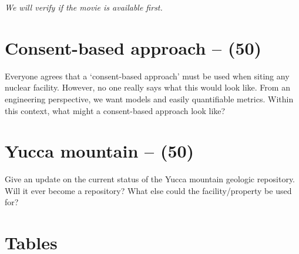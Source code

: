 \documentclass[11pt,a4paper]{article}
\makeatletter
\renewcommand\listoftables{%
    \@starttoc{lot}%
}
\makeatother
\begin{document}
\textit{We will verify if the movie is available first.}





\newpage

\section{Consent-based approach -- (50)}
Everyone agrees that a `consent-based approach' must be used when siting any nuclear facility. However, no one really says what this would look like. From an engineering perspective, we want models and easily quantifiable metrics. Within this context, what might a consent-based approach look like?





\newpage

\section{Yucca mountain -- (50)}
Give an update on the current status of the Yucca mountain geologic repository. Will it ever become a repository? What else could the facility/property be used for?





\pagestyle{fancyplain}
\fancyhf{} %
\renewcommand{\headrulewidth}{0pt} %
\rfoot{\fancyplain{}{\thepage}}
\nolinenumbers


%
%

\setlength{\bibhang}{0pt}

%


\newpage


\section*{Tables}

{%
\let\oldnumberline\numberline%
\renewcommand{\numberline}{\tablename~\oldnumberline}%
\listoftables%
}


\newpage
\end{document}
